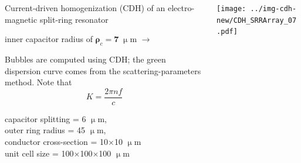\documentclass[t]{beamer} \usepackage[english]{babel} \usepackage[utf8]{inputenc} \usetheme{Frankfurt} %
\begin{document}
\begin{frame}[plain]{}%
\begin{columns}[T] %
	\begin{column}{.55\textwidth}
	\vspace{3mm}
	\noindent Current-driven homogenization (CDH) of an electro-magnetic split-ring resonator 
	\begin{exampleblock}\hfill inner capacitor radius of $\pmb\rho_c=\pmb{7}\;\upmu$m $\rightarrow$\end{exampleblock}
	\vspace{3mm}

	\noindent Bubbles are computed using CDH; the green dispersion curve comes from the scattering-parameters method. Note that $$K = \frac{2\pi n f}{c}$$
	\vspace{12mm}

	\small{capacitor splitting = 6 $\upmu$m,\\ outer ring radius = 45 $\upmu$m,\\ conductor cross-section = 10$\times$10 $\upmu$m\\ unit cell size = 100$\times$100$\times$100 $\upmu$m}
	\vspace{5mm}

	\end{column}%
	\begin{column}{.45\textwidth}%
		\vspace{-1mm}\texttt{[image: ../img-cdh-new/CDH\_SRRArray\_07.pdf]} 
	\end{column}
\end{columns}
\end{frame} 		%
\end{document}
